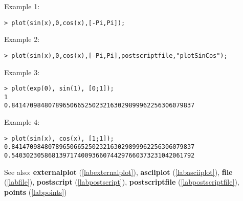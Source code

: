 \noindent Example 1: 
\begin{center}\begin{minipage}{15cm}\begin{Verbatim}[frame=single]
> plot(sin(x),0,cos(x),[-Pi,Pi]);
\end{Verbatim}
\end{minipage}\end{center}
\noindent Example 2: 
\begin{center}\begin{minipage}{15cm}\begin{Verbatim}[frame=single]
> plot(sin(x),0,cos(x),[-Pi,Pi],postscriptfile,"plotSinCos");
\end{Verbatim}
\end{minipage}\end{center}
\noindent Example 3: 
\begin{center}\begin{minipage}{15cm}\begin{Verbatim}[frame=single]
> plot(exp(0), sin(1), [0;1]);
1
0.84147098480789650665250232163029899962256306079837
\end{Verbatim}
\end{minipage}\end{center}
\noindent Example 4: 
\begin{center}\begin{minipage}{15cm}\begin{Verbatim}[frame=single]
> plot(sin(x), cos(x), [1;1]);
0.84147098480789650665250232163029899962256306079837
0.54030230586813971740093660744297660373231042061792
\end{Verbatim}
\end{minipage}\end{center}
See also: \textbf{externalplot} (\ref{labexternalplot}), \textbf{asciiplot} (\ref{labasciiplot}), \textbf{file} (\ref{labfile}), \textbf{postscript} (\ref{labpostscript}), \textbf{postscriptfile} (\ref{labpostscriptfile}), \textbf{points} (\ref{labpoints})
